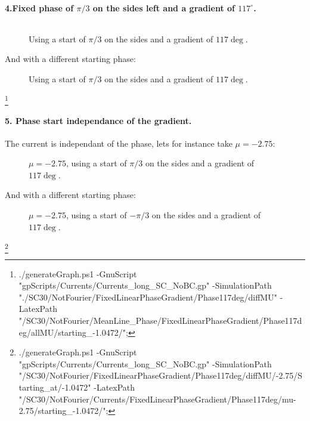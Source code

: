 \documentclass[../main.tex]{subfiles}
\begin{document}
\paragraph{4.Fixed phase of $\pi/3$ on the sides left and a gradient of $117^{\circ}$.}$~$\\
\begin{figure}[H]
    \centering
    
    \caption{Using a start of $\pi/3$ on the sides and a gradient of $117\si{\deg}$.}
\end{figure}
And  with a different starting phase:
\begin{figure}[H]
    \centering
    
    \caption{Using a start of $\pi/3$ on the sides and a gradient of $117\si{\deg}$.}
\end{figure}
\footnote{./generateGraph.ps1 -GnuScript "gpScripts/Currents/Currents\_long\_SC\_NoBC.gp" -SimulationPath "./SC30/NotFourier/FixedLinearPhaseGradient/Phase117deg/diffMU" -LatexPath "/SC30/NotFourier/MeanLine\_Phase/FixedLinearPhaseGradient/Phase117deg/allMU/starting\_-1.0472/";}

\paragraph{5. Phase start independance of the gradient.}$~$\\
The current is independant of the phase, lets for instance take $\mu = -2.75$:
\begin{figure}[H]
    \centering
    
    \caption{$\mu = -2.75$, using a start of $\pi/3$ on the sides and a gradient of $117\si{\deg}$.}
\end{figure}
And  with a different starting phase:
\begin{figure}[H]
    \centering
    
    \caption{$\mu = -2.75$, using a start of $-\pi/3$ on the sides and a gradient of $117\si{\deg}$.}
\end{figure}
\footnote{./generateGraph.ps1 -GnuScript "gpScripts/Currents/Currents\_long\_SC\_NoBC.gp" -SimulationPath "/SC30/NotFourier/FixedLinearPhaseGradient/Phase117deg/diffMU/-2.75/Starting\_at/-1.0472" -LatexPath "/SC30/NotFourier/Currents/FixedLinearPhaseGradient/Phase117deg/mu-2.75/starting\_-1.0472/";}
\end{document}
